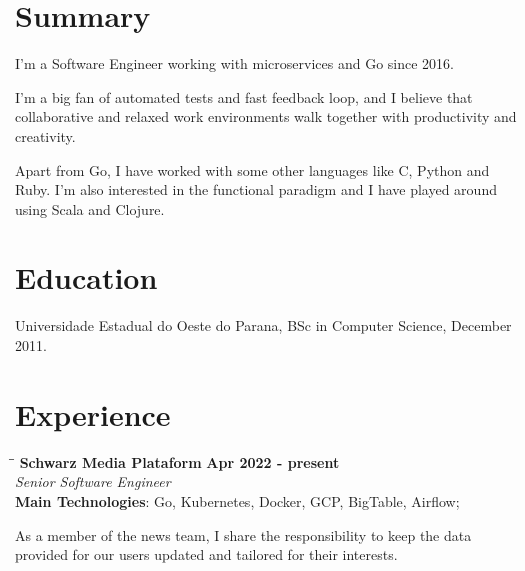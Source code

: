 \documentclass[margin]{res}
\begin{document}

\address{Wuppertal, Germany \\ cadicallegari@gmail.com \\ Phone: +49 0152 3663 8091}


\begin{resume}

\section{Summary}       I’m a Software Engineer working with microservices and Go since 2016.

I'm a big fan of automated tests and fast feedback loop, and I believe that collaborative and relaxed work environments walk together with productivity and creativity.



Apart from Go, I have worked with some other languages like C, Python and Ruby.
I'm also interested in the functional paradigm and I have played around using Scala and Clojure.



\section{Education} Universidade Estadual do Oeste do Parana, BSc in Computer Science, December 2011.

\section{Experience}

\vspace{-0.1in}
   \begin{tabbing}
   \hspace{2.3in}\= \hspace{1.7in}\= \kill %
    \textbf{Schwarz Media Plataform}    \>\>\textbf{Apr 2022 - present}\\
    \textit{Senior Software Engineer}\\
    \textbf{Main Technologies}: Go, Kubernetes, Docker, GCP, BigTable, Airflow;
   \end{tabbing}\vspace{-20pt}      %
    \vspace{2mm}

As a member of the news team, I share the responsibility to keep the data provided for our users updated and tailored for their interests.


\end{resume}
\end{document}

